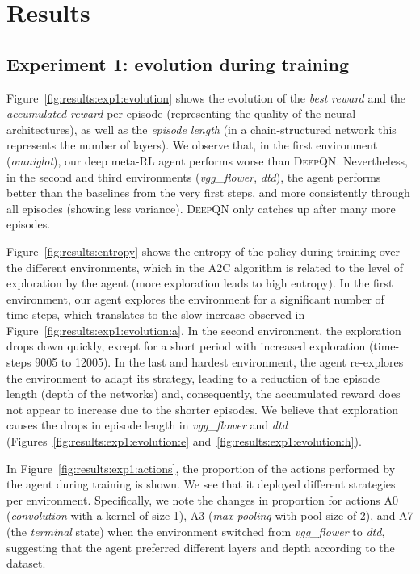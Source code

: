 \section{Results}\label{sec:results}


\subsection*{Experiment 1: evolution during training}

Figure~\ref{fig:results:exp1:evolution} shows the evolution of the \textit{best reward} and the \textit{accumulated reward} per episode (representing the quality of the neural architectures), as well as the \textit{episode length} (in a chain-structured network this represents the number of layers). We observe that, in the first environment (\textit{omniglot}), our deep meta-RL agent performs worse than \textsc{DeepQN}. Nevertheless, in the second and third environments (\textit{vgg\_flower}, \textit{dtd}), the agent performs better than the baselines from the very first steps, and more consistently through all episodes (showing less variance). \textsc{DeepQN} only catches up after many more episodes.

Figure~\ref{fig:results:entropy} shows the entropy of the policy during training over the different environments, which in the A2C algorithm is related to the level of exploration by the agent (more exploration leads to high entropy). In the first environment, our agent explores the environment for a significant number of time-steps, which translates to the slow increase observed in Figure~\ref{fig:results:exp1:evolution:a}. In the second environment, the exploration drops down quickly, except for a short period with increased exploration (time-steps 9005 to 12005). In the last and hardest environment, the agent re-explores the environment to adapt its strategy, leading to a reduction of the episode length (depth of the networks) and, consequently, the accumulated reward does not appear to increase due to the shorter episodes. We believe that exploration causes the drops in episode length in \textit{vgg\_flower} and \textit{dtd} (Figures~\ref{fig:results:exp1:evolution:e} and~\ref{fig:results:exp1:evolution:h}).

In Figure~\ref{fig:results:exp1:actions}, the proportion of the actions performed by the agent during training is shown. We see that it deployed different strategies per environment. Specifically, we note the changes in proportion for actions \textsc{A0} (\textit{convolution} with a kernel of size 1),  \textsc{A3} (\textit{max-pooling} with pool size of 2), and \textsc{A7} (the \textit{terminal} state) when the environment switched from \textit{vgg\_flower} to \textit{dtd}, suggesting that the agent preferred different layers and depth according to the dataset.

